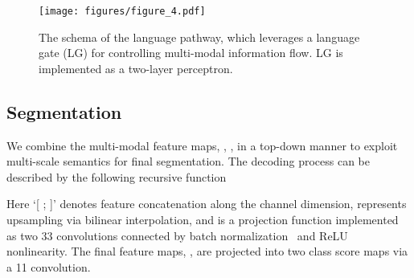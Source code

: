 \documentclass[10pt,twocolumn,letterpaper]{article}
\begin{document}
\begin{figure}[t]
\centering
\texttt{[image: figures/figure\_4.pdf]}
\vspace{5pt}
\caption{The schema of the language pathway, which leverages a language gate (LG) for controlling multi-modal information flow. LG is implemented as a two-layer perceptron.}
\label{fig:4}
\end{figure}



\subsection{Segmentation}
\label{sec:segmentation}
We combine the multi-modal feature maps, , , in a top-down manner to exploit multi-scale semantics for final segmentation.
The decoding process can be described by the following recursive function


Here `[ ; ]' denotes feature concatenation along the channel dimension,  represents upsampling via bilinear interpolation, and  is a projection function implemented as two 33 convolutions connected by batch normalization~\cite{ioffe2015batch} and ReLU~\cite{relu} nonlinearity.
The final feature maps, , are projected into two class score maps via a 11 convolution.
\end{document}
